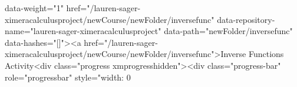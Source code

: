 data-weight="1" href="/lauren-sager-ximeracalculusproject/newCourse/newFolder/inversefunc" data-repository-name="lauren-sager-ximeracalculusproject" data-path="newFolder/inversefunc" data-hashes="[]"><a href="/lauren-sager-ximeracalculusproject/newCourse/newFolder/inversefunc">Inverse Functions Activity<div class="progress xmprogresshidden"><div class="progress-bar" role="progressbar" style="width: 0%